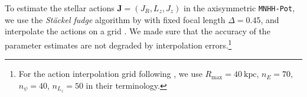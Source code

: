\documentclass[iop,revtex4,numberedappendix,appendixfloats]{emulateapj}
\newcommand{\vect}[1]{\boldsymbol{#1}}
\begin{document}
To estimate the stellar actions $\vect{J}=(J_R,L_z,J_z)$ in the axisymmetric \texttt{MNHH-Pot}, we use the \emph{St\"{a}ckel fudge} algorithm by \citet{2012MNRAS.426.1324B} with fixed focal length $\Delta=0.45$, and interpolate the actions on a grid \citep{2012MNRAS.426.1324B,2015ApJS..216...29B}. We made sure that the accuracy of the parameter estimates are not degraded by interpolation errors.\footnote{For the action interpolation grid following \citet{2015ApJS..216...29B}, we use $R_\text{max}=40~\text{kpc}$, $n_E=70$, $n_\psi=40$, $n_{L_z}=50$ in their terminology.}

\begin{figure}[!htbp]
  \centering

\end{figure}
\end{document}
